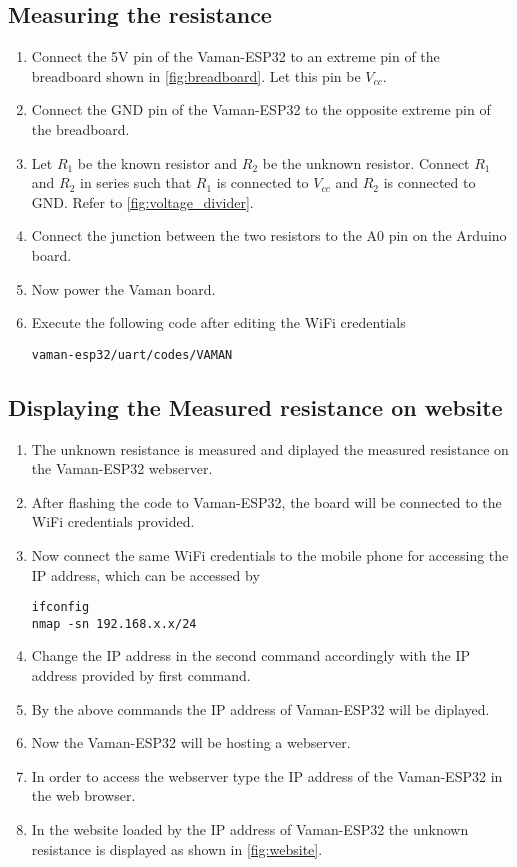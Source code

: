 \subsection{Measuring the resistance}
\begin{enumerate}
\item
Connect the 5V pin of the Vaman-ESP32 to an extreme pin of the breadboard shown
in \autoref{fig:breadboard}. Let this pin be $V_{cc}$.
\item
Connect the GND pin of the Vaman-ESP32 to the opposite extreme pin of the 
breadboard.
\item
Let $R_1$ be the known resistor and $R_2$ be the unknown resistor. Connect $R_1$
and $R_2$ in series such that $R_1$ is connected to $V_{cc}$ and $R_2$ is
connected to GND. Refer to \autoref{fig:voltage_divider}.
\item
Connect the junction between the two resistors to the A0 pin on the Arduino
board.
\item
Now power the Vaman board.
\item
Execute the following code after editing the WiFi credentials
\begin{lstlisting}
vaman-esp32/uart/codes/VAMAN
\end{lstlisting}
\end{enumerate}
\subsection{Displaying the Measured resistance on website}
\begin{enumerate}
\item The unknown resistance is measured and diplayed the measured resistance on
the Vaman-ESP32 webserver.
\item After flashing the code to Vaman-ESP32, the board will be connected to the
WiFi credentials provided.
\item Now connect the same WiFi credentials to the mobile phone for accessing
the IP address, which can be accessed by 
\begin{lstlisting}
ifconfig
nmap -sn 192.168.x.x/24
\end{lstlisting}
\item Change the IP address in the second command accordingly with the IP
address provided by first command.
\item By the above commands the IP address of Vaman-ESP32 will be diplayed.
\item Now the Vaman-ESP32 will be hosting a webserver.
\item In order to access the webserver type the IP address of the Vaman-ESP32 in
the web browser.
\item In the website loaded by the IP address of Vaman-ESP32 the unknown 
resistance is displayed as shown in \autoref{fig:website}.
\end{enumerate}
